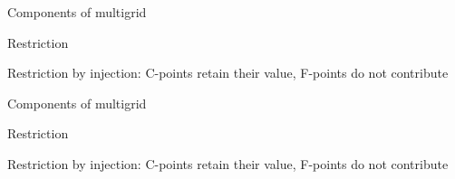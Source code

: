 \documentclass[18pt,xcolor=table]{beamer}
\begin{document}
\begin{frame}{Components of multigrid}
\begin{block}{Restriction}
\bit
\item Restriction by injection: C-points retain their value, F-points do not contribute
\eit
{}
\end{block}
\end{frame}

\begin{frame}{Components of multigrid}
\begin{block}{Restriction}
\bit
\item Restriction by injection: C-points retain their value, F-points do not contribute
\eit
\end{block}
\end{frame}
\end{document}

